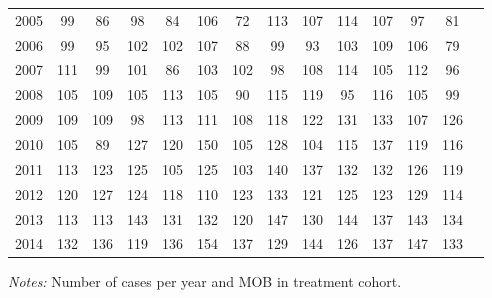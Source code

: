 \begin{table}[H]
\begin{threeparttable}
{\begin{tabular}{l*{13}{c}}
2005        &          99&          86&          98&          84&         106&          72&         113&         107&         114&         107&          97&          81\\
2006        &          99&          95&         102&         102&         107&          88&          99&          93&         103&         109&         106&          79\\
2007        &         111&          99&         101&          86&         103&         102&          98&         108&         114&         105&         112&          96\\
2008        &         105&         109&         105&         113&         105&          90&         115&         119&          95&         116&         105&          99\\
2009        &         109&         109&          98&         113&         111&         108&         118&         122&         131&         133&         107&         126\\
2010        &         105&          89&         127&         120&         150&         105&         128&         104&         115&         137&         119&         116\\
2011        &         113&         123&         125&         105&         125&         103&         140&         137&         132&         132&         126&         119\\
2012        &         120&         127&         124&         118&         110&         123&         133&         121&         125&         123&         129&         114\\
2013        &         113&         113&         143&         131&         132&         120&         147&         130&         144&         137&         143&         134\\
2014        &         132&         136&         119&         136&         154&         137&         129&         144&         126&         137&         147&         133\\
 \bottomrule \end{tabular} } \begin{tablenotes} \item \scriptsize \emph{Notes:} Number of cases per year and MOB in treatment cohort. \end{tablenotes} \end{threeparttable} \end{table} 
